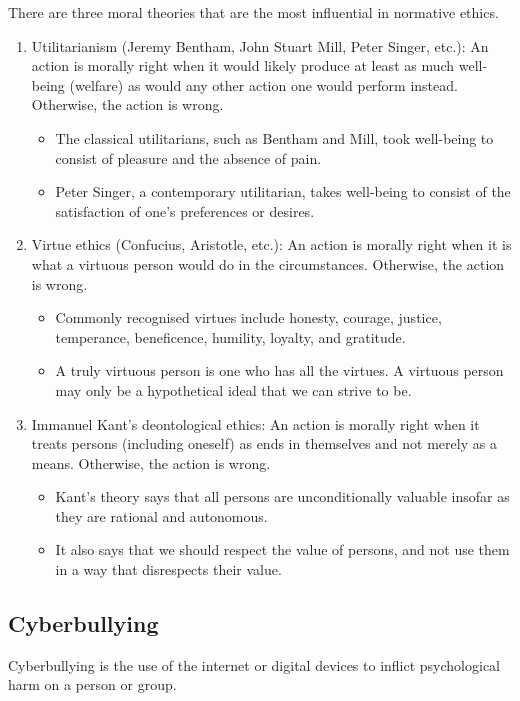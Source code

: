 \documentclass[11pt]{article}
\begin{document}
There are three moral theories that are the most influential in normative ethics.
\begin{enumerate}
\item Utilitarianism (Jeremy Bentham, John Stuart Mill, Peter Singer, etc.): An action is morally right when it would likely produce at least as much well-being (welfare) as would any other action one would perform instead. Otherwise, the action is wrong.
\begin{itemize}
\item The classical utilitarians, such as Bentham and Mill, took well-being to consist of pleasure and the absence of pain.
\item Peter Singer, a contemporary utilitarian, takes well-being to consist of the satisfaction of one's preferences or desires.
\end{itemize}

\item Virtue ethics (Confucius, Aristotle, etc.): An action is morally right when it is what a virtuous person would do in the circumstances. Otherwise, the action is wrong.
\begin{itemize}
\item Commonly recognised virtues include honesty, courage, justice, temperance, beneficence, humility, loyalty, and gratitude.
\item A truly virtuous person is one who has all the virtues. A virtuous person may only be a hypothetical ideal that we can strive to be.
\end{itemize}

\item Immanuel Kant's deontological ethics: An action is morally right when it treats persons (including oneself) as ends in themselves and not merely as a means. Otherwise, the action is wrong.
\begin{itemize}
\item Kant's theory says that all persons are unconditionally valuable insofar as they are rational and autonomous.
\item It also says that we should respect the value of persons, and not use them in a way that disrespects their value.
\end{itemize}
\end{enumerate}

 \newpage

\subsection{Cyberbullying}
\label{sec:orge2eef60}
Cyberbullying is the use of the internet or digital devices to inflict psychological harm on a person or group.
\end{document}
